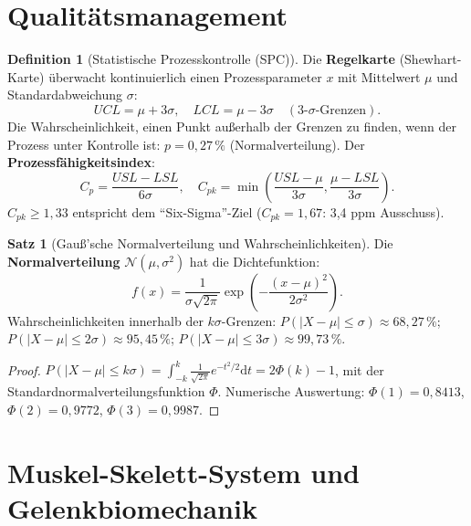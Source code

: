 ﻿\documentclass[a4paper,12pt]{report}
\theoremstyle{definition}
\newtheorem{definition}{Definition}
\newtheorem{satz}{Satz}
\begin{document}
\section{Qualitätsmanagement}

\begin{definition}[Statistische Prozesskontrolle (SPC)]
Die \textbf{Regelkarte} (Shewhart-Karte) überwacht kontinuierlich
einen Prozessparameter $x$ mit Mittelwert $\mu$ und Standardabweichung $\sigma$:
\[
  UCL = \mu + 3\sigma, \quad LCL = \mu - 3\sigma \quad (\text{3-$\sigma$-Grenzen}).
\]
Die Wahrscheinlichkeit, einen Punkt außerhalb der Grenzen zu finden,
wenn der Prozess unter Kontrolle ist: $p = 0{,}27\,\%$ (Normalverteilung).
Der \textbf{Prozessfähigkeitsindex}:
\[
  C_p = \frac{USL - LSL}{6\sigma}, \quad C_{pk} = \min\left(\frac{USL-\mu}{3\sigma}, \frac{\mu-LSL}{3\sigma}\right).
\]
$C_{pk} \ge 1{,}33$ entspricht dem ``Six-Sigma''-Ziel ($C_{pk} = 1{,}67$: 3{,}4 ppm Ausschuss).
\end{definition}

\begin{satz}[Gauß'sche Normalverteilung und Wahrscheinlichkeiten]
Die \textbf{Normalverteilung} $\mathcal{N}(\mu, \sigma^2)$ hat die Dichtefunktion:
\[
  f(x) = \frac{1}{\sigma\sqrt{2\pi}}\exp\left(-\frac{(x-\mu)^2}{2\sigma^2}\right).
\]
Wahrscheinlichkeiten innerhalb der $k\sigma$-Grenzen:
$P(|X-\mu| \le \sigma) \approx 68{,}27\,\%$;
$P(|X-\mu| \le 2\sigma) \approx 95{,}45\,\%$;
$P(|X-\mu| \le 3\sigma) \approx 99{,}73\,\%$.
\end{satz}
\begin{proof}
$P(|X-\mu| \le k\sigma) = \int_{-k}^k \frac{1}{\sqrt{2\pi}}e^{-t^2/2}\mathrm{d}t
= 2\Phi(k) - 1$, mit der Standardnormalverteilungsfunktion $\Phi$.
Numerische Auswertung: $\Phi(1) = 0{,}8413$, $\Phi(2) = 0{,}9772$, $\Phi(3) = 0{,}9987$.
\end{proof}


\section{Muskel-Skelett-System und Gelenkbiomechanik}
\end{document}
